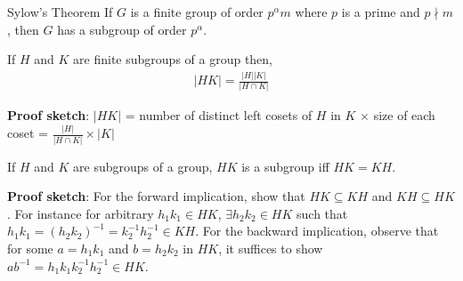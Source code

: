 \documentclass[titlepage, 12pt]{article}
\begin{document}
\begin{theorem}{Sylow's Theorem}{}
    If $G$ is a finite group of order $p^\alpha m$ where $p$ is a prime and
    $p\nmid m$, then $G$ has a subgroup of order $p^\alpha$.
\end{theorem}
\begin{proposition}{}{}
    If $H$ and $K$ are finite subgroups of a group then,
    \begin{gather*}
        |HK| = \frac{|H||K|}{|H\cap K|}
    \end{gather*}
\end{proposition}{}{}
\textbf{Proof sketch}: $|HK|$ = number of distinct left cosets of $H$ in $K$
$\times$ size of each coset = $\frac{|H|}{|H\cap K|}\times |K|$
\begin{proposition}{}{}
    If $H$ and $K$ are subgroups of a group, $HK$ is a subgroup iff $HK = KH$.
\end{proposition}
\textbf{Proof sketch}:  For the forward implication, show that $HK\subseteq KH$
and $KH\subseteq HK$. For instance for arbitrary $h_1k_1\in HK$, $\exists
h_2k_2\in HK$ such that $h_1k_1 = (h_2k_2)^{-1} = k_2^{-1}h_2^{-1}\in KH$. For
the backward implication, observe that for some $a = h_1k_1$ and $b = h_2k_2$ in
$HK$, it suffices to show $ab^{-1} = h_1k_1k_2^{-1}h_2^{-1}\in HK$.
\end{document}
